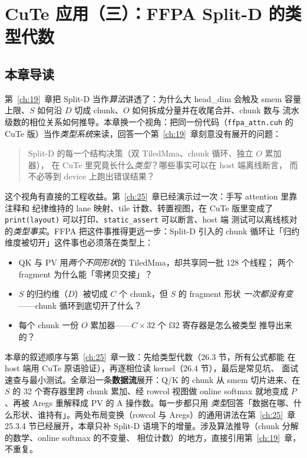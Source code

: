 \chapter{CuTe 应用（三）：FFPA Split-D 的类型代数}\label{ch:26}

\section{本章导读}

第~\ref{ch:19}~章把 Split-D 当作\emph{算法}讲透了：为什么大 head\_dim 会触及
smem 容量上限、$S$ 如何沿 $D$ 切成 chunk、$O$ 如何拆成分量并在收尾合并、chunk 数与
流水级数的相位关系如何推导。本章换一个视角：把同一份代码（\texttt{ffpa\_\allowbreak{}attn.\allowbreak{}cuh}
的 CuTe 版）当作\emph{类型系统}来读，回答一个第~\ref{ch:19}~章刻意没有展开的问题：

\begin{quote}
  Split-D 的每一个结构决策（双 TiledMma、chunk 循环、独立 $O$ 累加器），
  在 CuTe 里究竟长什么\emph{类型}？哪些事实可以在 host 端离线断言，
  而不必等到 device 上跑出错误结果？
\end{quote}

这个视角有直接的工程收益。第~\ref{ch:25}~章已经演示过一次：手写 attention 里靠注释和
纪律维持的 lane 映射、tile 计数、转置视图，在 CuTe 版里变成了
\texttt{print\allowbreak{}(layout)} 可以打印、\texttt{static\_\allowbreak{}assert} 可以断言、host 端
测试可以离线核对的\emph{类型事实}。FFPA 把这件事推得更远一步：Split-D 引入的
chunk 循环让「归约维度被切开」这件事也必须落在类型上：

\begin{itemize}[itemsep=2pt,topsep=2pt]
  \item QK 与 PV 用\emph{两个不同形状}的 TiledMma，却共享同一批 128 个线程；
        两个 fragment 为什么能「零拷贝交接」？
  \item $S$ 的归约维（$D$）被切成 $C$ 个 chunk，但 $S$ 的 fragment 形状
        \emph{一次都没有变}——chunk 循环到底切开了什么？
  \item 每个 chunk 一份 $O$ 累加器——$C\times 32$ 个 f32 寄存器是怎么被类型
        推导出来的？
\end{itemize}

本章的叙述顺序与第~\ref{ch:25}~章一致：先给类型代数（26.3 节，所有公式都能
在 host 端用 CuTe 原语验证），再逐相位读 kernel（26.4 节），最后是常见坑、
面试速查与最小测试。全章沿一条\textbf{数据流}展开：Q/K 的 chunk 从 smem
切片进来、在 $S$ 的 32 个寄存器里跨 chunk 累加、经 rowcol 视图做 online
softmax 就地变成 $P$、再被 Aregs 重解释成 PV 的 A 操作数。每一步都只用
\emph{类型}回答「数据在哪、什么形状、谁持有」。两处布局变换（rowcol 与
Aregs）的通用讲法在第~\ref{ch:25}~章 25.3.4 节已经展开，本章只补 Split-D
语境下的增量。涉及算法推导（chunk 分解的数学、online softmax 的不变量、
相位计数）的地方，直接引用第~\ref{ch:19}~章，不重复。

